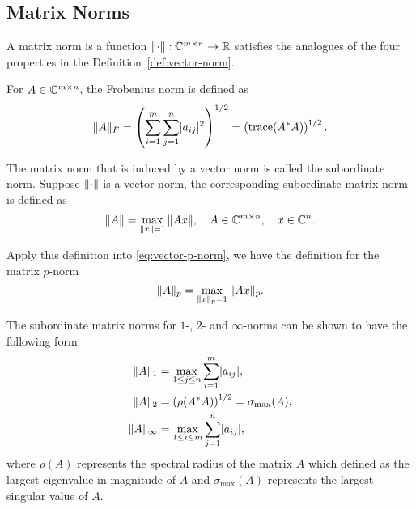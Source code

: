 \documentclass[12pt]{article}
\begin{document}
\subsection{Matrix Norms} \label{subsec:matrix-norms}
\begin{definition}
    A matrix norm is a function $\|{\cdot}\|:\mathbb{C}^{m\times n} \to \mathbb{R}$ satisfies the analogues of the four properties in the Definition~\ref{def:vector-norm}.
\end{definition}

\begin{example}
    For $A\in\mathbb{C}^{m\times n}$, the Frobenius norm is defined as
    \begin{equation}
        \notag
        \|{A}\|_F = \left(\sum_{i = 1}^m \sum_{j = 1}^n \lvert a_{ij}\rvert^2\right)^{1/2} = \left(\mathrm{trace}(A^* A)\right)^{1/2}.
    \end{equation}
\end{example}

\begin{example}
    The matrix norm that is induced by a vector norm is called the subordinate norm. Suppose $\|{\cdot}\|$ is a vector norm, the corresponding subordinate matrix norm is defined as 
    \begin{equation}
        \notag 
        \|{A}\| = \max_{\|{x}\| = 1} \|{Ax}\|, \quad A \in \mathbb{C}^{m\times n}, \quad x \in \mathbb{C}^n.
    \end{equation}

    Apply this definition into \eqref{eq:vector-p-norm}, we have the definition for the matrix $p$-norm 
    \begin{equation}
        \notag 
        \|{A}\|_p = \max_{\|{x}\|_p = 1} \|{Ax}\|_{p}.
    \end{equation}

    The subordinate matrix norms for $1$-, $2$- and $\infty$-norms can be shown to have the following form 
    \begin{equation}
        \notag 
        \begin{aligned}
            \|{A}\|_1 &= \max_{1\leq j \leq n} \sum_{i = 1}^m \lvert a_{ij}\rvert, \\
            \|{A}\|_2 &= \left(\rho(A^* A)\right)^{1/2} = \sigma_{\max}(A),\\
            \|{A}\|_\infty & = \max_{1 \leq i \leq m} \sum_{j = 1}^n \lvert a_{ij}\rvert,
        \end{aligned}
    \end{equation}
    where $\rho(A)$ represents the spectral radius of the matrix $A$ which defined as the largest eigenvalue in magnitude of $A$ and $\sigma_{\max}(A)$ represents the largest singular value of $A$.
\end{example}
\end{document}
